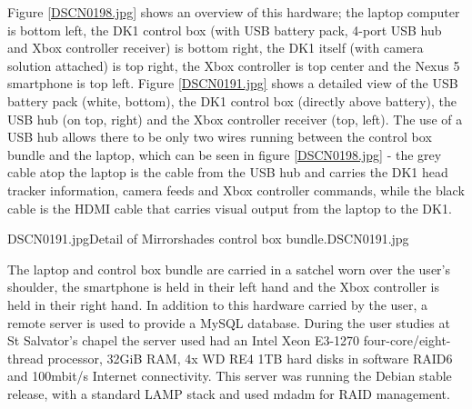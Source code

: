 Figure \ref{DSCN0198.jpg} shows an overview of this hardware; the laptop computer is bottom left, the DK1 control box (with USB battery pack, 4-port USB hub and Xbox controller receiver) is bottom right, the DK1 itself (with camera solution attached) is top right, the Xbox controller is top center and the Nexus 5 smartphone is top left. Figure \ref{DSCN0191.jpg} shows a detailed view of the USB battery pack (white, bottom), the DK1 control box (directly above battery), the USB hub (on top, right) and the Xbox controller receiver (top, left). The use of a USB hub allows there to be only two wires running between the control box bundle and the laptop, which can be seen in figure \ref{DSCN0198.jpg} - the grey cable atop the laptop is the cable from the USB hub and carries the DK1 head tracker information, camera feeds and Xbox controller commands, while the black cable is the HDMI cable that carries visual output from the laptop to the DK1.

       {DSCN0191.jpg}{Detail of Mirrorshades control box bundle.}{DSCN0191.jpg}

The laptop and control box bundle are carried in a satchel worn over the user's shoulder, the smartphone is held in their left hand and the Xbox controller is held in their right hand. In addition to this hardware carried by the user, a remote server is used to provide a MySQL database. During the user studies at St Salvator's chapel the server used had an Intel Xeon E3-1270 four-core/eight-thread processor, 32GiB RAM, 4x WD RE4 1TB hard disks in software RAID6 and 100mbit/s Internet connectivity. This server was running the Debian stable release, with a standard LAMP stack and used mdadm for RAID management.

